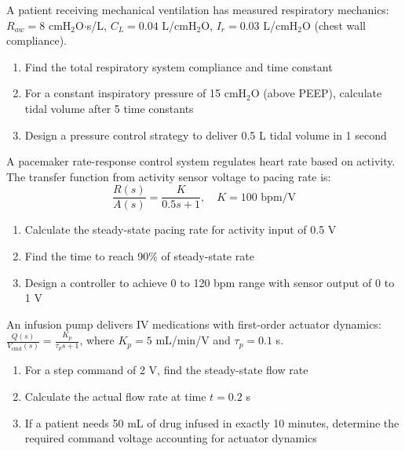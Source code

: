 \begin{exercise}
A patient receiving mechanical ventilation has measured respiratory mechanics: $R_{aw} = 8$ cmH$_2$O$\cdot$s/L, $C_L = 0.04$ L/cmH$_2$O, $I_r = 0.03$ L/cmH$_2$O (chest wall compliance).
\begin{enumerate}[label=(\alph*)]
    \item Find the total respiratory system compliance and time constant
    \item For a constant inspiratory pressure of 15 cmH$_2$O (above PEEP), calculate tidal volume after 5 time constants
    \item Design a pressure control strategy to deliver 0.5 L tidal volume in 1 second
\end{enumerate}
\end{exercise}

\begin{exercise}
A pacemaker rate-response control system regulates heart rate based on activity. The transfer function from activity sensor voltage to pacing rate is:
\begin{equation}
\frac{R(s)}{A(s)} = \frac{K}{0.5s + 1}, \quad K = 100 \text{ bpm/V}
\end{equation}
\begin{enumerate}[label=(\alph*)]
    \item Calculate the steady-state pacing rate for activity input of 0.5 V
    \item Find the time to reach 90\% of steady-state rate
    \item Design a controller to achieve 0 to 120 bpm range with sensor output of 0 to 1 V
\end{enumerate}
\end{exercise}

\begin{exercise}
An infusion pump delivers IV medications with first-order actuator dynamics: $\frac{Q(s)}{V_{\text{cmd}}(s)} = \frac{K_p}{\tau_p s + 1}$, where $K_p = 5$ mL/min/V and $\tau_p = 0.1$ s.
\begin{enumerate}[label=(\alph*)]
    \item For a step command of 2 V, find the steady-state flow rate
    \item Calculate the actual flow rate at time $t = 0.2$ s
    \item If a patient needs 50 mL of drug infused in exactly 10 minutes, determine the required command voltage accounting for actuator dynamics
\end{enumerate}
\end{exercise}

